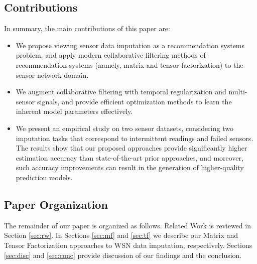 
\subsection{Contributions}

In summary, the main contributions of this paper are:
\begin{itemize}
\item We propose viewing sensor data imputation as a recommendation systems problem, and apply modern collaborative filtering
methods of recommendation systems (namely, matrix and tensor factorization) to the sensor network domain.
\item We augment collaborative filtering with temporal regularization and multi-sensor signals, and provide efficient 
optimization methods to learn the inherent model parameters effectively.
\item We present an empirical study on two sensor datasets, considering two
imputation tasks that correspond to intermittent readings and failed
sensors. The results show that our proposed approaches provide
significantly higher estimation accuracy than state-of-the-art prior
approaches, and moreover, such accuracy improvements can result in the
generation of higher-quality prediction models.
\end{itemize}


\subsection{Paper Organization}

The remainder of our paper is organized as follows.  Related Work is
reviewed in Section \ref{sec:rw}.  In Sections \ref{sec:mf} and
\ref{sec:tf} we describe our Matrix and Tensor Factorization
approaches to WSN data imputation, respectively.  Sections
\ref{sec:disc} and \ref{sec:conc} provide discussion of our findings
and the conclusion.
